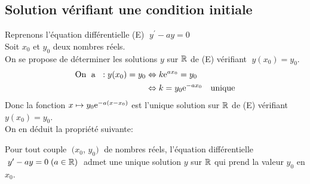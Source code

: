 \subsection*{Solution vérifiant une condition initiale}

Reprenons l'équation différentielle (E)  $\; y^{\prime}-ay=0 $\\
Soit $ x_{0}$ et $y_{0} $  deux nombres réels.\\
On se propose de déterminer les solutions  $ y $ sur $ \mathbb{R} $  de (E)  vérifiant  $\; y(x_{0})=y_{0} $.
\begin{align*}
\text{On \;a }\;: y(x_{0})=y_{0} &\Leftrightarrow k\mathrm{e}^{ax_{0}}=y_{0}\\
&\Leftrightarrow k=y_{0}\mathrm{e}^{-ax_{0}}\quad \text{unique}
\end{align*}
Donc la fonction \; $ x\mapsto y_{0}\mathrm{e}^{-a(x-x_{0})} $\; est l'unique solution sur $ \mathbb{R} $  de (E)  vérifiant \; $ y(x_{0})=y_{0} $.\\
On en déduit la propriété suivante:

\begin{property}
Pour tout couple $\; (x_{0}$, $y_{0}) \;$ de nombres réels, l'équation différentielle   $ \;y^{\prime}-ay=0 \;(a\in\mathbb{R})\;$ admet une unique solution $ y $ sur $ \mathbb{R} $  qui prend la valeur $y_{0} $ en $x_{0} $.
\end{property}


